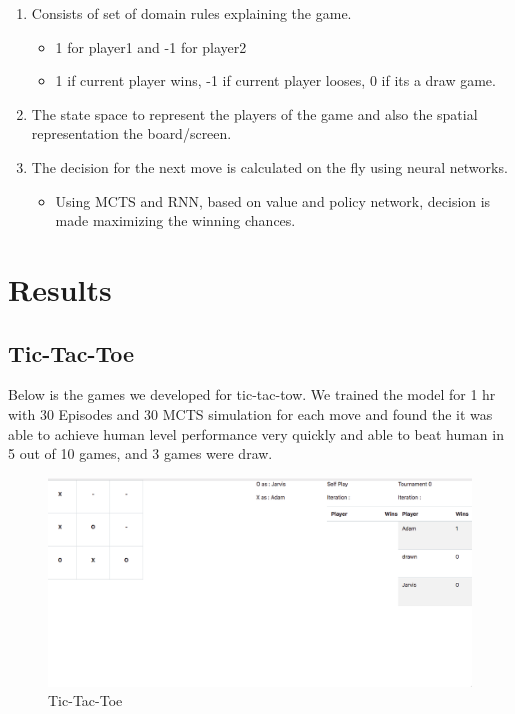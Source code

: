 \documentclass{article}
\begin{document}
\begin{enumerate}
    \item Consists of set of domain rules explaining the game.
        \begin{itemize}
            \item 1 for player1 and -1 for player2
            \item 1 if current player wins, -1 if current player looses, 0 if its a draw game.
        \end{itemize}
    \item The state space to represent the players of the game and also the spatial
representation the board/screen.

    \item The decision for the next move is calculated on the fly using neural networks.
        \begin{itemize}
            \item Using MCTS and RNN, based on value and policy network, decision is made maximizing the winning chances.
        \end{itemize}
\end{enumerate}

\section{Results}
\subsection{Tic-Tac-Toe}

Below is the games we developed for tic-tac-tow. We trained the model for 1 hr with 30 Episodes and 30 MCTS simulation for each move and found the it was able to achieve human level performance very quickly and able to beat human in 5 out of 10 games, and 3 games were draw.
\begin{figure}[H]
    \centering
    \includegraphics[width=\textwidth,scale=0.5]{tictactoe.png}
    \caption{Tic-Tac-Toe}
    \label{fig:my_label}
\end{figure}
\end{document}
